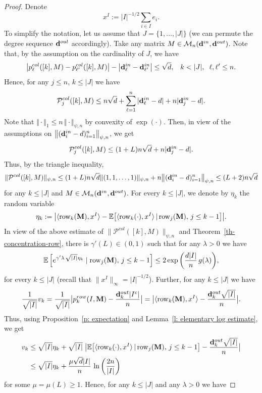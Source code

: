 \documentclass[12pt]{article}
\theoremstyle{definition}
\theoremstyle{plain}
\newcommand{\E}{\mathbb{E}}
\def\ranmtx{{\bf{}M}}
\def\InDeg{{\bf d}^{in}}
\def\OutDeg{{\bf d}^{out}}
\def\MatrixSet{{\mathcal M}_n}
\def\Row{{\rm row}}
\def\pvector{{\mathcal P}}
\def\gfunction{{g}}
\begin{document}
\begin{proof}
Denote
$$x^I:=|I|^{-1/2}\sum_{i\in I}e_i.$$
To simplify the notation, let us assume that $J=\{1,\ldots, \vert J\vert\}$
(we can permute the degree sequence $\OutDeg$ accordingly).  
Take any matrix $M\in \MatrixSet(\InDeg,\OutDeg)$.
Note that, by the assumption on the cardinality of $J$, we have
$$\big|p_\ell^{col}([k],M)-p_{\ell'}^{col}([k],M)\big|
-\big|\InDeg_{\ell}-\InDeg_{\ell'}\big|\leq \sqrt{d},\;\;\;k< |J|,\;\;\ell,\ell'\leq n.$$
Hence, for any $j\leq n$, $k\leq|J|$ we have
$$\pvector^{col}_j([k],M)
\leq n\sqrt{d}+\sum_{\ell=1}^n |\InDeg_\ell-d|+n|\InDeg_j-d|.
$$
Note that $\Vert \cdot\Vert_1\leq n\, \Vert\cdot \Vert_{\psi,n}$
by convexity of $\exp(\cdot)$.
Then, in view of the assumptions on $\bigl\|(\InDeg_i-d)_{i=1}^n\bigr\|_{\psi,n}$, we get 
$$
\pvector^{col}_j([k],M)
\leq (1+L)n\sqrt{d}+n|\InDeg_j-d|.$$
Thus, by the triangle inequality,
$$\|\pvector^{col}([k],M)\|_{\psi,n}\leq
(1+L)n\sqrt{d}\|(1,1,\ldots,1)\|_{\psi,n}+n\bigl\|(\InDeg_i-d)_{i=1}^n\bigr\|_{\psi,n}\leq
 (L+2)n\sqrt{d}$$
for any $k\leq|J|$ and $M\in\MatrixSet(\InDeg,\OutDeg)$. 
For every $k\leq\vert J\vert$, we denote by $\eta_k$ the random variable 
$$
\eta_k:= \big\vert\langle \Row_k(\ranmtx),x^I\rangle -\E\big[\langle \Row_k(\cdot),x^I\rangle\,|\,
\Row_j(\ranmtx),\,j\leq k-1\big]\big\vert.
$$
In view of the above estimate of $\|\pvector^{col}([k],M)\|_{\psi,n}$ and
Theorem~\ref{th-concentration-row}, there is $\gamma'(L)\in (0,1)$ such that for any $\lambda>0$
we have
$$
\E \left[e^{\gamma' \lambda\, \sqrt{\vert I\vert} \eta_k}\mid \Row_j(\ranmtx),\,j\leq {k-1}\right]
\leq 2\exp\bigg(\frac{d\vert I\vert}{n}\,\gfunction(\lambda)\bigg),
$$
for every $k\leq\vert J\vert$ (recall that $\|x^I\|_\infty=|I|^{-1/2}$). 
Further, for any $k\leq\vert J\vert$ we have
$$\frac{1}{\sqrt{\vert I\vert}} v_k=\frac{1}{\sqrt{\vert I\vert}}\big\vert p_k^{row}(I,\ranmtx)-\frac{\OutDeg_k|I^c|}{n}\big\vert
=\big\vert\langle \Row_k(\ranmtx),x^I\rangle -\frac{\OutDeg_k\sqrt{|I|}}{n}\big\vert.
$$
Thus, using Proposition~\ref{p: expectation} and Lemma~\ref{l: elementary log estimate}, we get
\begin{align*}
v_k&\leq \sqrt{\vert I\vert} \eta_k+\sqrt{|I|}\;\big|\E\big[\langle \Row_k(\cdot),x^I\rangle\,|\,
\Row_j(\ranmtx),\,j\leq k-1\big]-\frac{\OutDeg_k\sqrt{|I|}}{n}\big|\\
&\leq \sqrt{\vert I\vert} \eta_k+ \frac{\mu\sqrt{d}\vert I\vert}{n}\, \ln\left(\frac{2n}{\vert I\vert}\right)
\end{align*}
for some $\mu=\mu(L)\geq 1$.
Hence, for any $k\leq|J|$ and any $\lambda>0$ we have 

\end{proof}
\end{document}
